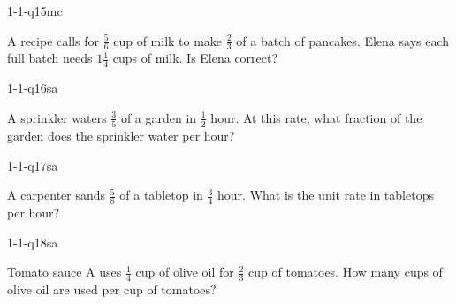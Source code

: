 \begin{practiceQuestion}{1-1-q15}{mc}
\begin{questionText}
A recipe calls for $\frac{5}{6}$ cup of milk to make $\frac{2}{3}$ of a batch of pancakes. Elena says each full batch needs $1\frac{1}{4}$ cups of milk. Is Elena correct?
\end{questionText}
\end{practiceQuestion}


\begin{practiceQuestion}{1-1-q16}{sa}
\begin{questionText}
A sprinkler waters $\frac{3}{5}$ of a garden in $\frac{1}{2}$ hour. At this rate, what fraction of the garden does the sprinkler water per hour?
\end{questionText}
\end{practiceQuestion}

\begin{practiceQuestion}{1-1-q17}{sa}
\begin{questionText}
A carpenter sands $\frac{5}{8}$ of a tabletop in $\frac{3}{4}$ hour. What is the unit rate in tabletops per hour?
\end{questionText}
\end{practiceQuestion}

\begin{practiceQuestion}{1-1-q18}{sa}
\begin{questionText}
Tomato sauce A uses $\frac{1}{4}$ cup of olive oil for $\frac{2}{3}$ cup of tomatoes. How many cups of olive oil are used per cup of tomatoes?
\end{questionText}
\end{practiceQuestion}

